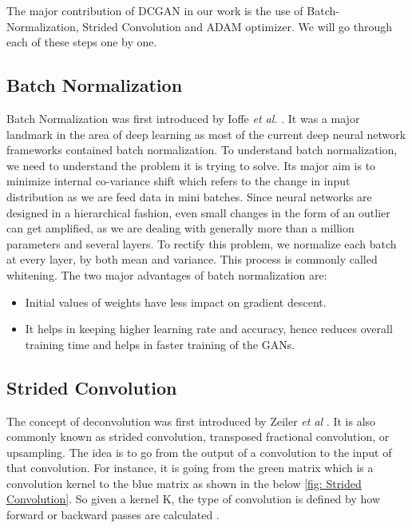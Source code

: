 The major contribution of DCGAN in our work is the use of Batch-Normalization, Strided Convolution and ADAM optimizer. We will go through each of these steps one by one.
\subsection{Batch Normalization}

Batch Normalization was first introduced by Ioffe  \textit{et al.} \cite{BatchNorm}. It was a major landmark in the area of deep learning as most of the current deep neural network frameworks contained batch normalization. 
To understand batch normalization, we need to understand the problem it is trying to solve. Its major aim is to minimize internal co-variance shift which refers to the change in input distribution as we are feed data in mini batches. Since neural networks are designed in a hierarchical fashion, even small changes in the form of an outlier can get amplified, as we are dealing with generally more than a million parameters and several layers. To rectify this problem, we normalize each batch at every layer, by both mean and variance. This process is commonly called whitening. The two major advantages of batch normalization are:
\begin{itemize}
    \item Initial values of weights have less impact on gradient descent.
    \item It helps in keeping higher learning rate and accuracy, hence reduces overall training time and helps in faster training of the GANs.
\end{itemize}

\subsection{Strided Convolution}

The concept of deconvolution was first introduced by Zeiler \textit{et al} \cite{Deconv}. It is also commonly known as  strided convolution, transposed fractional convolution, or upsampling. The idea is to go from the output of a convolution to the input of that convolution. For instance, it is going from the green matrix which is a convolution kernel to the blue matrix as shown in the below \cref{fig: Strided Convolution}. So given a kernel K, the type of convolution is defined by how forward or backward passes are calculated \cite{Deconv-Theano}.


